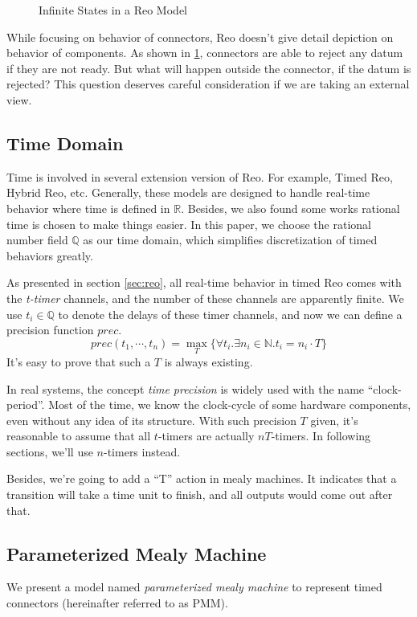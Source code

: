 \documentclass[conference, a4paper]{IEEEtran}
\begin{document}

\begin{figure}[h]
  \caption{Infinite States in a Reo Model}
  \label{fig:reoinfinite}
\end{figure}

While focusing on behavior of connectors, Reo doesn't give detail depiction on behavior of
components. As shown in \figurename \ref{fig:reoinfinite}, connectors are able to reject any datum
if they are not ready. But what will happen outside the connector, if the datum is rejected? This
question deserves careful consideration if we are taking an external view.

\subsection{Time Domain}
Time is involved in several extension version of Reo. For example, Timed
Reo\cite{DBLP:conf/sefm/ArbabBBR04}, Hybrid Reo\cite{DBLP:conf/icfem/ChenSS14}, etc.
Generally, these models are designed to handle real-time behavior where time is defined in
$\mathbb{R}$. Besides, we also found some works\cite{DBLP:journals/fmsd/PrabhakarDM015} rational
time is chosen to make things easier. In this paper, we choose the rational number field
$\mathbb{Q}$ as our time domain, which simplifies discretization of timed behaviors greatly.

As presented in section \ref{sec:reo}, all real-time behavior in timed Reo comes with the
\emph{t-timer} channels, and the number of these channels are apparently finite. We use
$t_i\in\mathbb{Q}$ to denote the delays of these timer channels, and now we can define a precision
function $prec$.
\[
prec(t_1,\cdots,t_n) = \max_T\{\forall t_i.\exists n_i\in\mathbb{N}.t_i=n_i\cdot T\}
\]
It's easy to prove that such a $T$ is always existing.

In real systems, the concept \emph{time precision} is widely used with the name ``clock-period''.
Most of the time, we know the clock-cycle of some hardware components, even without any idea of its
structure. With such precision $T$ given, it's reasonable to assume that all $t$-timers are actually
$nT$-timers. In following sections, we'll use $n$-timers instead.

Besides, we're going to add a ``T'' action in mealy machines. It indicates that a transition
will take a time unit to finish, and all outputs would come out after that.

\subsection{Parameterized Mealy Machine}
We present a model named \emph{parameterized mealy machine} to represent timed connectors
(hereinafter referred to as PMM). 
\end{document}
